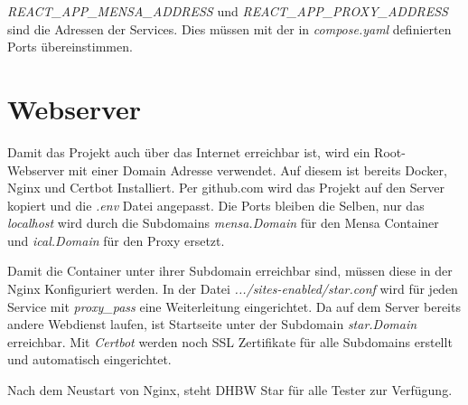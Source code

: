 \emph{REACT\_APP\_MENSA\_ADDRESS} und \emph{REACT\_APP\_PROXY\_ADDRESS} sind die Adressen der Services. Dies müssen mit der in \emph{compose.yaml} definierten Ports übereinstimmen. 

\section{Webserver}
Damit das Projekt auch über das Internet erreichbar ist, wird ein Root-Webserver mit einer Domain Adresse verwendet. Auf diesem ist bereits Docker, Nginx und Certbot Installiert.
Per github.com wird das Projekt auf den Server kopiert und die \emph{.env} Datei angepasst. Die Ports bleiben die Selben, nur das \emph{localhost} wird durch die Subdomains \emph{mensa.Domain} für den Mensa Container und \emph{ical.Domain} für den Proxy ersetzt.

Damit die Container unter ihrer Subdomain erreichbar sind, müssen diese in der Nginx Konfiguriert werden. In der Datei \emph{.../sites-enabled/star.conf} wird für jeden Service mit \emph{proxy\_pass} eine Weiterleitung eingerichtet.
Da auf dem Server bereits andere Webdienst laufen, ist Startseite unter der Subdomain \emph{star.Domain} erreichbar. Mit \emph{Certbot} werden noch SSL Zertifikate für alle Subdomains erstellt und automatisch eingerichtet.

Nach dem Neustart von Nginx, steht DHBW Star für alle Tester zur Verfügung.

